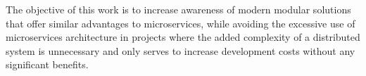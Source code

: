 The objective of this work is to increase awareness of modern modular solutions that offer similar advantages to microservices, while avoiding the excessive use of microservices architecture in projects where the added complexity of a distributed system is unnecessary and only serves to increase development costs without any significant benefits.

